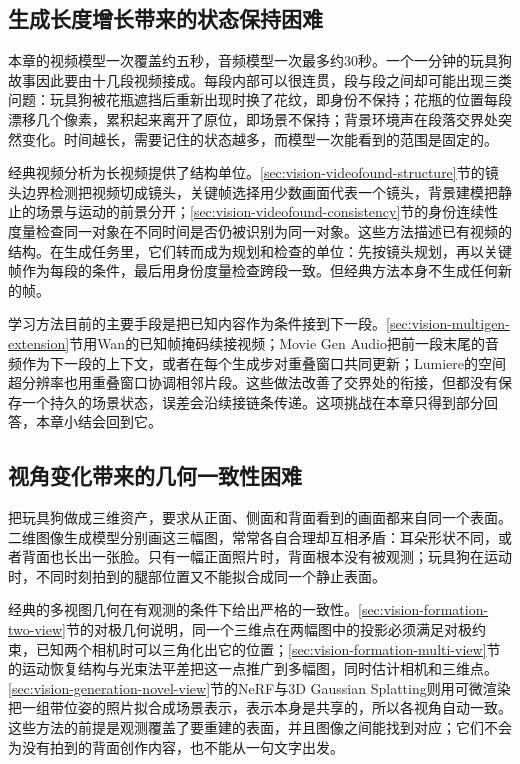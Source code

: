 \subsection{生成长度增长带来的状态保持困难}
\label{sec:vision-multigen-challenge-long}

本章的视频模型一次覆盖约五秒，音频模型一次最多约30秒。一个一分钟的玩具狗故事因此要由十几段视频接成。每段内部可以很连贯，段与段之间却可能出现三类问题：玩具狗被花瓶遮挡后重新出现时换了花纹，即身份不保持；花瓶的位置每段漂移几个像素，累积起来离开了原位，即场景不保持；背景环境声在段落交界处突然变化。时间越长，需要记住的状态越多，而模型一次能看到的范围是固定的。

经典视频分析为长视频提供了结构单位。\ref{sec:vision-videofound-structure}节的镜头边界检测把视频切成镜头，关键帧选择用少数画面代表一个镜头，背景建模把静止的场景与运动的前景分开；\ref{sec:vision-videofound-consistency}节的身份连续性度量检查同一对象在不同时间是否仍被识别为同一对象。这些方法描述已有视频的结构。在生成任务里，它们转而成为规划和检查的单位：先按镜头规划，再以关键帧作为每段的条件，最后用身份度量检查跨段一致。但经典方法本身不生成任何新的帧。

学习方法目前的主要手段是把已知内容作为条件接到下一段。\ref{sec:vision-multigen-extension}节用Wan的已知帧掩码续接视频；Movie Gen Audio把前一段末尾的音频作为下一段的上下文，或者在每个生成步对重叠窗口共同更新；Lumiere的空间超分辨率也用重叠窗口协调相邻片段。这些做法改善了交界处的衔接，但都没有保存一个持久的场景状态，误差会沿续接链条传递。这项挑战在本章只得到部分回答，本章小结会回到它。

\subsection{视角变化带来的几何一致性困难}
\label{sec:vision-multigen-challenge-geometry}

把玩具狗做成三维资产，要求从正面、侧面和背面看到的画面都来自同一个表面。二维图像生成模型分别画这三幅图，常常各自合理却互相矛盾：耳朵形状不同，或者背面也长出一张脸。只有一幅正面照片时，背面根本没有被观测；玩具狗在运动时，不同时刻拍到的腿部位置又不能拟合成同一个静止表面。

经典的多视图几何在有观测的条件下给出严格的一致性。\ref{sec:vision-formation-two-view}节的对极几何说明，同一个三维点在两幅图中的投影必须满足对极约束，已知两个相机时可以三角化出它的位置；\ref{sec:vision-formation-multi-view}节的运动恢复结构与光束法平差把这一点推广到多幅图，同时估计相机和三维点。\ref{sec:vision-generation-novel-view}节的NeRF与3D Gaussian Splatting则用可微渲染把一组带位姿的照片拟合成场景表示，表示本身是共享的，所以各视角自动一致。这些方法的前提是观测覆盖了要重建的表面，并且图像之间能找到对应；它们不会为没有拍到的背面创作内容，也不能从一句文字出发。

